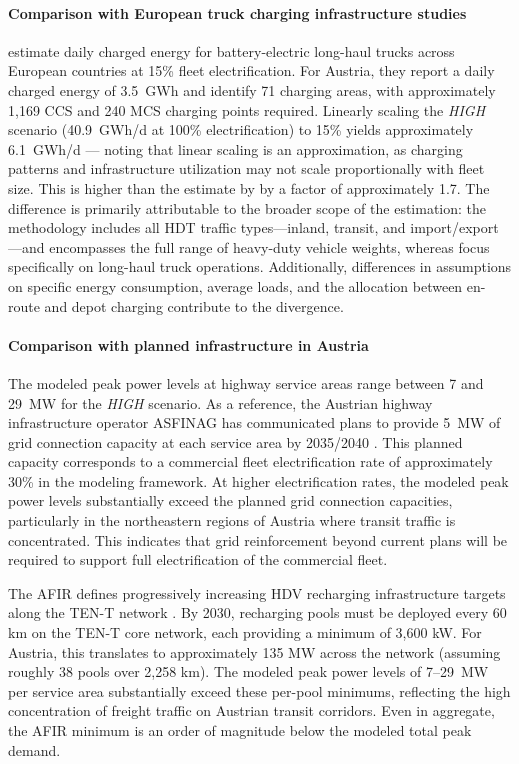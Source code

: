 \paragraph*{Comparison with European truck charging infrastructure studies}
\citet{SHOMAN2023103825} estimate daily charged energy for battery-electric long-haul trucks across European countries at 15\% fleet electrification. For Austria, they report a daily charged energy of 3.5~GWh and identify 71 charging areas, with approximately 1,169 CCS and 240 MCS charging points required. Linearly scaling the \textit{HIGH} scenario (40.9~GWh/d at 100\% electrification) to 15\% yields approximately 6.1~GWh/d — noting that linear scaling is an approximation, as charging patterns and infrastructure utilization may not scale proportionally with fleet size. This is higher than the estimate by \citet{SHOMAN2023103825} by a factor of approximately 1.7. The difference is primarily attributable to the broader scope of the estimation: the methodology includes all \ac{HDT} traffic types---inland, transit, and import/export---and encompasses the full range of heavy-duty vehicle weights, whereas \citet{SHOMAN2023103825} focus specifically on long-haul truck operations. Additionally, differences in assumptions on specific energy consumption, average loads, and the allocation between en-route and depot charging contribute to the divergence.

\paragraph*{Comparison with planned infrastructure in Austria}
The modeled peak power levels at highway service areas range between 7 and 29~MW for the \textit{HIGH} scenario. As a reference, the Austrian highway infrastructure operator ASFINAG has communicated plans to provide 5~MW of grid connection capacity at each service area by 2035/2040 \cite{ioebenergiespeicher}. This planned capacity corresponds to a commercial fleet electrification rate of approximately 30\% in the modeling framework. At higher electrification rates, the modeled peak power levels substantially exceed the planned grid connection capacities, particularly in the northeastern regions of Austria where transit traffic is concentrated. This indicates that grid reinforcement beyond current plans will be required to support full electrification of the commercial fleet.

The AFIR defines progressively increasing HDV recharging infrastructure targets along the TEN-T network \cite{EU2023AFIR}. By 2030, recharging pools must be deployed every 60 km on the TEN-T core network, each providing a minimum of 3,600 kW. For Austria, this translates to approximately 135 MW across the network (assuming roughly 38 pools over 2,258 km). The modeled peak power levels of 7–29~MW per service area substantially exceed these per-pool minimums, reflecting the high concentration of freight traffic on Austrian transit corridors. Even in aggregate, the AFIR minimum is an order of magnitude below the modeled total peak demand.




